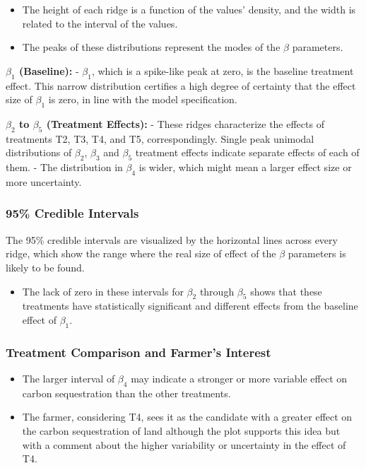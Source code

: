 \documentclass[
]{article}
\providecommand{\tightlist}{%
  \setlength{\itemsep}{0pt}\setlength{\parskip}{0pt}}
\begin{document}
\begin{itemize}
\tightlist
\item
  The height of each ridge is a function of the values' density, and the
  width is related to the interval of the values.
\item
  The peaks of these distributions represent the modes of the \(\beta\)
  parameters.
\end{itemize}

\textbf{\(\beta_1\) (Baseline):} - \(\beta_1\), which is a spike-like
peak at zero, is the baseline treatment effect. This narrow distribution
certifies a high degree of certainty that the effect size of \(\beta_1\)
is zero, in line with the model specification.

\textbf{\(\beta_2\) to \(\beta_5\) (Treatment Effects):} - These ridges
characterize the effects of treatments T2, T3, T4, and T5,
correspondingly. Single peak unimodal distributions of \(\beta_2\),
\(\beta_3\) and \(\beta_5\) treatment effects indicate separate effects
of each of them. - The distribution in \(\beta_4\) is wider, which might
mean a larger effect size or more uncertainty.

\subsubsection{95\% Credible Intervals}\label{credible-intervals}

The 95\% credible intervals are visualized by the horizontal lines
across every ridge, which show the range where the real size of effect
of the \(\beta\) parameters is likely to be found.

\begin{itemize}
\tightlist
\item
  The lack of zero in these intervals for \(\beta_2\) through
  \(\beta_5\) shows that these treatments have statistically significant
  and different effects from the baseline effect of \(\beta_1\).
\end{itemize}

\subsubsection{Treatment Comparison and Farmer's
Interest}\label{treatment-comparison-and-farmers-interest}

\begin{itemize}
\tightlist
\item
  The larger interval of \(\beta_4\) may indicate a stronger or more
  variable effect on carbon sequestration than the other treatments.
\item
  The farmer, considering T4, sees it as the candidate with a greater
  effect on the carbon sequestration of land although the plot supports
  this idea but with a comment about the higher variability or
  uncertainty in the effect of T4.
\end{itemize}
\end{document}
